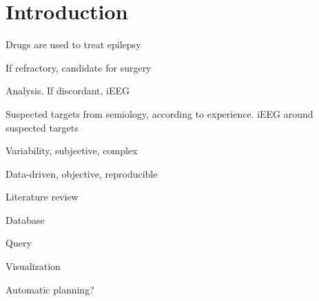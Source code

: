 \section{Introduction}



Drugs are used to treat epilepsy

If refractory, candidate for surgery

Analysis. If discordant, iEEG

Suspected targets from semiology, according to experience. iEEG around suspected targets

Variability, subjective, complex

Data-driven, objective, reproducible

Literature review

Database

Query

Visualization

Automatic planning?
